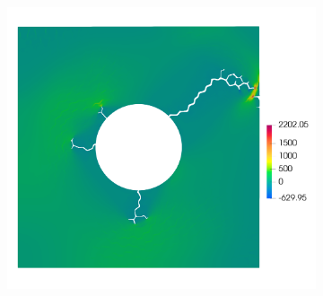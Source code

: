 \begin{figure}[htb!]
  \begin{subfigure}[t]{0.3\linewidth}
    \centering
    \includegraphics[width=\linewidth]{Chapter3/figures/r5_ext30_stress}
    \caption{}
  \end{subfigure}
  

\end{figure}
